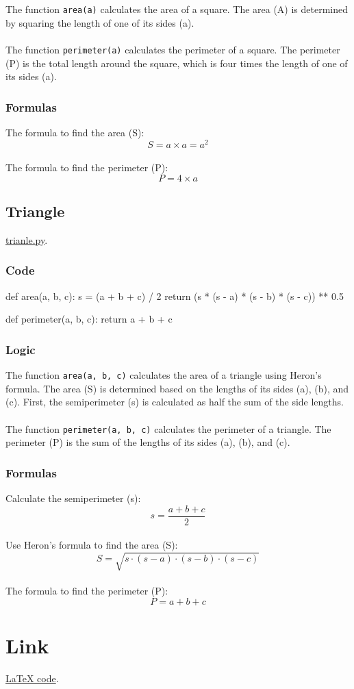 \documentclass[12pt]{article}
\begin{document}
The function \texttt{area(a)} calculates the area of a square. The area (A) is determined by squaring the length of one of its sides (a). \\
\\
The function \texttt{perimeter(a)} calculates the perimeter of a square. The perimeter (P) is the total length around the square, which is four times the length of one of its sides (a). 

\subsubsection{Formulas}

The formula to find the area (S):
\[S = a \times a = a^2\] \\
The formula to find the perimeter (P):
\[P = 4 \times a\]

\newpage

\subsection{Triangle}
\href{https://github.com/niumandzi/geometric_lib/blob/docs/triangle.py}{trianle.py}.
\subsubsection{Code}
\begin{python}
def area(a, b, c):
    s = (a + b + c) / 2
    return (s * (s - a) * (s - b) * (s - c)) ** 0.5

def perimeter(a, b, c):
    return a + b + c
\end{python}

\subsubsection{Logic}

The function \texttt{area(a, b, c)} calculates the area of a triangle using Heron's formula. The area (S) is determined based on the lengths of its sides (a), (b), and (c). First, the semiperimeter (s) is calculated as half the sum of the side lengths. \\
\\
The function \texttt{perimeter(a, b, c)} calculates the perimeter of a triangle. The perimeter (P) is the sum of the lengths of its sides (a), (b), and (c). 
\subsubsection{Formulas}

Calculate the semiperimeter (s):
\[s = \frac{a + b + c}{2}\] \\
Use Heron's formula to find the area (S):
\[S = \sqrt{s \cdot (s - a) \cdot (s - b) \cdot (s - c)}\] \\
The formula to find the perimeter (P):
\[P = a + b + c\]

\section{Link}
\href{https://github.com/follow-madara/geometric_lib/tree/latex/docs/main.tex}{LaTeX code}.
\end{document}

